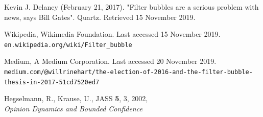 \documentclass[11pt]{article}
\begin{document}
\newpage
\begin{thebibliography}{9}
     Kevin J. Delaney (February 21, 2017). "Filter bubbles are a serious problem with news, says Bill Gates". Quartz. Retrieved 15 November 2019.
    
     Wikipedia, Wikimedia Foundation. Last accessed 15 November 2019.\\\texttt{en.wikipedia.org/wiki/Filter\_bubble}
    
    Medium, A Medium Corporation. Last accessed 20 November 2019.\\ \texttt{medium.com/@willrinehart/the-election-of-2016-and-the-filter-bubble-thesis-in-2017-51cd7520ed7}
    
    Hegselmann, R., Krause, U., JASS \textbf{5}, 3, 2002,\\
    \textit{Opinion Dynamics and Bounded Confidence}
    
\end{thebibliography}

\newpage

\appendix

\end{document}
